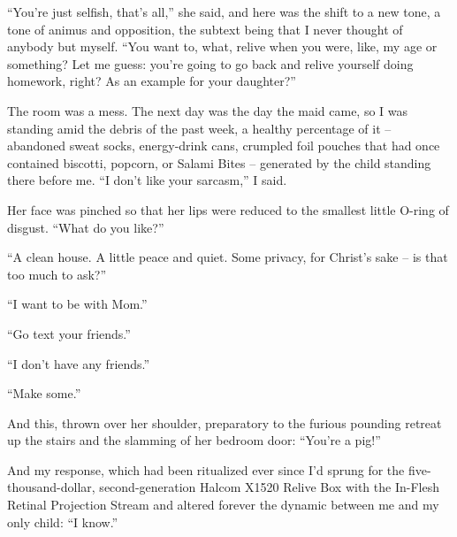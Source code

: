 \documentclass[11pt,a4paper]{article}
\newcommand{\qm}[1]{“#1”}
\begin{document}
\qm{You're just selfish, that's all,} she said, and here was the shift to a new tone, a tone of animus and opposition, the subtext being that I never thought of anybody but myself. \qm{You want to, what, relive when you were, like, my age or something? Let me guess: you're going to go back and relive yourself doing homework, right? As an example for your daughter?}

The room was a mess. The next day was the day the maid came, so I was standing amid the debris of the past week, a healthy percentage of it – abandoned sweat socks, energy-drink cans, crumpled foil pouches that had once contained biscotti, popcorn, or Salami Bites – generated by the child standing there before me. \qm{I don't like your sarcasm,} I said.

Her face was pinched so that her lips were reduced to the smallest little O-ring of disgust. \qm{What do you like?}

\qm{A clean house. A little peace and quiet. Some privacy, for Christ's sake – is that too much to ask?}

\qm{I want to be with Mom.}

\qm{Go text your friends.}

\qm{I don't have any friends.}

\qm{Make some.}

And this, thrown over her shoulder, preparatory to the furious pounding retreat up the stairs and the slamming of her bedroom door: \qm{You're a pig!}

And my response, which had been ritualized ever since I'd sprung for the five-thousand-dollar, second-generation Halcom X1520 Relive Box with the In-Flesh Retinal Projection Stream and altered forever the dynamic between me and my only child: \qm{I know.}
\end{document}
